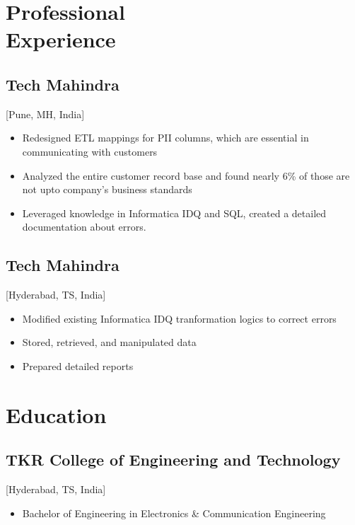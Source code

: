\documentclass{mycv}
\begin{document}
\maketitle%
\section{Professional \\ Experience }

\subsection{Tech Mahindra}[Pune, MH, India]
\begin{positions}
\end{positions}

\begin{itemize}
  \item Redesigned ETL mappings for PII columns, which are essential in communicating with customers
  \item Analyzed the entire customer record base and found nearly 6\% of those are not upto company's business standards
  \item Leveraged knowledge in Informatica IDQ and SQL, created a detailed documentation about errors.  
\end{itemize}

\subsection{Tech Mahindra}[Hyderabad, TS, India]
\begin{positions}
\end{positions}

\begin{itemize}
  \item Modified existing Informatica IDQ tranformation logics to correct errors
  \item Stored, retrieved, and manipulated data
  \item Prepared detailed reports
\end{itemize}

\section{Education}

\subsection{TKR College of Engineering and Technology}[Hyderabad, TS, India]
\vspace{-\parskip}%
\begin{itemize}[label={}]
  \item Bachelor of Engineering in Electronics \& Communication Engineering 
\end{itemize}
\end{document}
